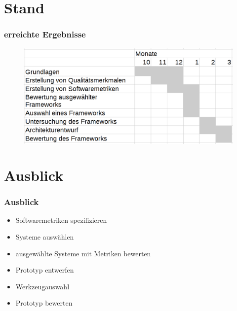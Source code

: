 \documentclass{beamer}
\begin{document}
\section{Stand}
\begin{frame}\frametitle{erreichte Ergebnisse}
\begin{figure}[htb]
  \begin{center}
    \includegraphics[width=1\hsize]{Plan.png}
  \end{center}
\end{figure}
\end{frame}


\section{Ausblick}
\begin{frame}\frametitle{Ausblick}
\begin{itemize}
\item Softwaremetriken spezifizieren
\item Systeme auswählen
\item ausgewählte Systeme mit Metriken bewerten
\item Prototyp entwerfen
\item Werkzeugauswahl
\item Prototyp bewerten
\end{itemize}
\end{frame}
\end{document}
